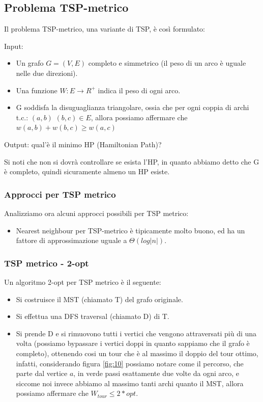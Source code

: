 \documentclass[12pt,a4paper]{article}
\begin{document}
\subsection{Problema TSP-metrico}
Il problema TSP-metrico, una variante di TSP, è così formulato:

Input:
\begin{itemize}
\item Un grafo $G = (V, E)$ completo e simmetrico (il peso di un arco è uguale nelle due direzioni).
\item Una funzione $W: E \rightarrow R^+$ indica il peso di ogni arco.
\item G soddisfa la disuguaglianza triangolare, ossia che per ogni coppia di archi t.c.:  $(a, b)$ $(b, c) \in E$, allora possiamo affermare che $w(a, b) + w(b, c) \geqslant w(a, c)$
\end{itemize}
Output: qual'è il minimo HP (Hamiltonian Path)?

Si noti che non si dovrà controllare se esista l'HP, in quanto abbiamo detto che G è completo, quindi sicuramente almeno un HP esiste.

\subsubsection{Approcci per TSP metrico}
Analizziamo ora alcuni approcci possibili per TSP metrico:
\begin{itemize}
\item Nearest neighbour per TSP-metrico è tipicamente molto buono, ed ha un fattore di approssimazione uguale a $\Theta(log \vert n \vert )$.
\end{itemize}

\subsubsection{TSP metrico - 2-opt}
Un algoritmo 2-opt per TSP metrico è il seguente:
\begin{itemize}
\item Si costruisce il MST (chiamato T) del grafo originale.
\item Si effettua una DFS traversal (chiamato D) di T.
\item Si prende D e si rimuovono tutti i vertici che vengono attraversati più di una volta (possiamo bypassare i vertici doppi in quanto sappiamo che il grafo è completo), ottenendo cosi un tour che è al massimo il doppio del tour ottimo, infatti, considerando figura \ref{fig:10} possiamo notare come il percorso, che parte dal vertice $a$, in verde passi esattamente due volte da ogni arco, e siccome noi invece abbiamo al massimo tanti archi quanto il MST, allora possiamo affermare che $W_{tour} \leq 2 * opt$.
\end{itemize}
\end{document}

